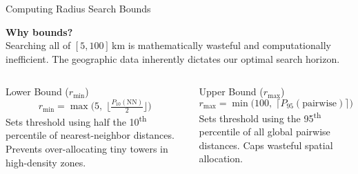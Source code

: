 \begin{frame}[t]{Computing Radius Search Bounds}{}
    \begin{center}
    \begin{minipage}{0.92\textwidth}
        \textbf{Why bounds?}\\[4pt]
        Searching all of $[5,100]$\,km is mathematically wasteful and computationally inefficient. The geographic data inherently dictates our optimal search horizon.
    \end{minipage}
    \end{center}
    \vspace{0.4cm}
    \begin{columns}[T]
        
        \vspace{-0.45cm} %
        
        \begin{center}
        \begin{minipage}{0.92\textwidth}
            \begin{block}{Lower Bound ($r_{\min}$)}
                \begin{equation*}
                    r_{\min} = \max\!\Big(5,\; \big\lfloor \tfrac{P_{10}(\text{NN})}{2} \big\rfloor\Big)
                \end{equation*}
                \vspace{0.1cm}
                {\small Sets threshold using half the 10\textsuperscript{th} percentile of nearest-neighbor distances. Prevents over-allocating tiny towers in high-density zones.}
            \end{block}
        \end{minipage}
        \end{center}

        \vspace{-0.45cm} %
        \begin{center}
        \begin{minipage}{0.92\textwidth} %
            \begin{block}{Upper Bound ($r_{\max}$)}
                \begin{equation*}
                    r_{\max} = \min\!\Big(100,\; \big\lceil P_{95}(\text{pairwise}) \big\rceil\Big)
                \end{equation*}
                \vspace{0.1cm}
                {\small Sets threshold using the 95\textsuperscript{th} percentile of all global pairwise distances. Caps wasteful spatial allocation.}
            \end{block}
        \end{minipage}
        \end{center}
    \end{columns}

\end{frame}

